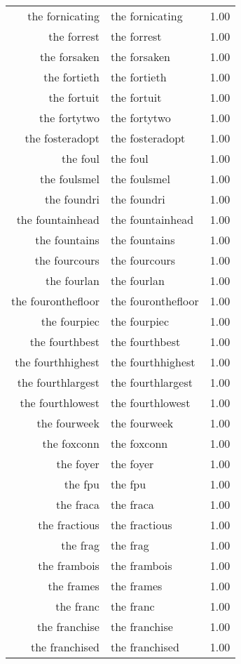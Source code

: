 \begin{table}[ht]
\begin{tabular}{rlr}
  the fornicating & the fornicating & 1.00 \\ 
  the forrest & the forrest & 1.00 \\ 
  the forsaken & the forsaken & 1.00 \\ 
  the fortieth & the fortieth & 1.00 \\ 
  the fortuit & the fortuit & 1.00 \\ 
  the fortytwo & the fortytwo & 1.00 \\ 
  the fosteradopt & the fosteradopt & 1.00 \\ 
  the foul & the foul & 1.00 \\ 
  the foulsmel & the foulsmel & 1.00 \\ 
  the foundri & the foundri & 1.00 \\ 
  the fountainhead & the fountainhead & 1.00 \\ 
  the fountains & the fountains & 1.00 \\ 
  the fourcours & the fourcours & 1.00 \\ 
  the fourlan & the fourlan & 1.00 \\ 
  the fouronthefloor & the fouronthefloor & 1.00 \\ 
  the fourpiec & the fourpiec & 1.00 \\ 
  the fourthbest & the fourthbest & 1.00 \\ 
  the fourthhighest & the fourthhighest & 1.00 \\ 
  the fourthlargest & the fourthlargest & 1.00 \\ 
  the fourthlowest & the fourthlowest & 1.00 \\ 
  the fourweek & the fourweek & 1.00 \\ 
  the foxconn & the foxconn & 1.00 \\ 
  the foyer & the foyer & 1.00 \\ 
  the fpu & the fpu & 1.00 \\ 
  the fraca & the fraca & 1.00 \\ 
  the fractious & the fractious & 1.00 \\ 
  the frag & the frag & 1.00 \\ 
  the frambois & the frambois & 1.00 \\ 
  the frames & the frames & 1.00 \\ 
  the franc & the franc & 1.00 \\ 
  the franchise & the franchise & 1.00 \\ 
  the franchised & the franchised & 1.00 \\ 

\end{tabular}
\end{table}
